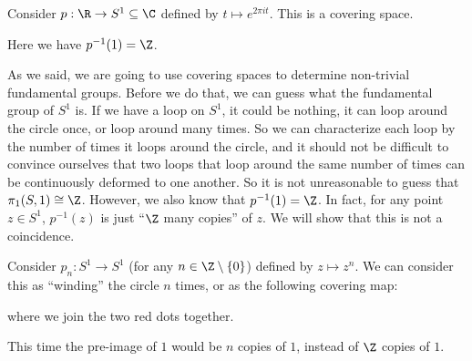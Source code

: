 \documentclass[a4paper]{article}
\begin{document}
\begin{eg}
  Consider $p: \R \to S^1\subseteq \C$ defined by $t \mapsto e^{2\pi i t}$. This is a covering space.
  \begin{center}
  \end{center}
  Here we have $p^{-1}(1) = \Z$.
\end{eg}
As we said, we are going to use covering spaces to determine non-trivial fundamental groups. Before we do that, we can guess what the fundamental group of $S^1$ is. If we have a loop on $S^1$, it could be nothing, it can loop around the circle once, or loop around many times. So we can characterize each loop by the number of times it loops around the circle, and it should not be difficult to convince ourselves that two loops that loop around the same number of times can be continuously deformed to one another. So it is not unreasonable to guess that $\pi_1(S, 1) \cong \Z$. However, we also know that $p^{-1}(1) = \Z$. In fact, for any point $z\in S^1$, $p^{-1}(z)$ is just ``$\Z$ many copies'' of $z$. We will show that this is not a coincidence.

\begin{eg}
  Consider $p_n: S^1 \to S^1$ (for any $n \in \Z\setminus\{0\}$) defined by $z \mapsto z^n$.  We can consider this as ``winding'' the circle $n$ times, or as the following covering map:
  \begin{center}
  \end{center}
  where we join the two red dots together.

  This time the pre-image of $1$ would be $n$ copies of $1$, instead of $\Z$ copies of $1$.
\end{eg}
\end{document}
